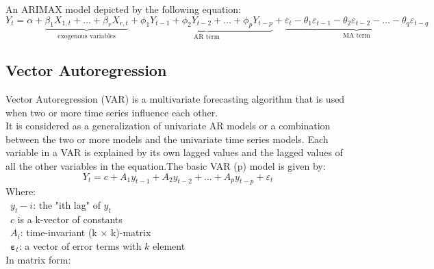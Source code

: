 \documentclass{ieeeojies}
\begin{document}

An ARIMAX model depicted by the following equation:
\begin{dmath*}
    Y_t = \alpha
    + \underbrace{\beta_1 X_{1,t} + \ldots + \beta_r X_{r,t}}_{\text{exogenous variables}}
    + \underbrace{\phi_1 Y_{t-1} + \phi_2 Y_{t-2} + \ldots + \phi_p Y_{t-p}}_{\text{AR term}}
    + \underbrace{\varepsilon_t - \theta_1 \varepsilon_{t-1} - \theta_2 \varepsilon_{t-2} - \ldots - \theta_q \varepsilon_{t-q}}_{\text{MA term}}
\end{dmath*}

\subsection{Vector Autoregression}
Vector Autoregression (VAR) is a multivariate forecasting algorithm that is used when two or more time series influence each other. \\
It is considered as a generalization of univariate AR models or a combination between the two or more models and the univariate time series models. Each variable in a VAR is explained by its own lagged values and the lagged values of all the other variables in the equation.The basic VAR (p) model is given by:
\[Y_t=c+A_1y_{t-1}+A_2y_{t-2}+...+A_py_{t-p}+\varepsilon_t\]
Where:\\
\indent\textbullet\ \(y_t-i\): the "ith lag" of \(y_t\)\\
\indent\textbullet\ \(c\) is a k-vector of constants\\
\indent\textbullet\ \(A_i\): time-invariant (k × k)-matrix\\
\indent\textbullet\ \(\boldsymbol{\varepsilon}_t\): a vector of error terms with \(k\) element\\
In matrix form:\\
\end{document}
